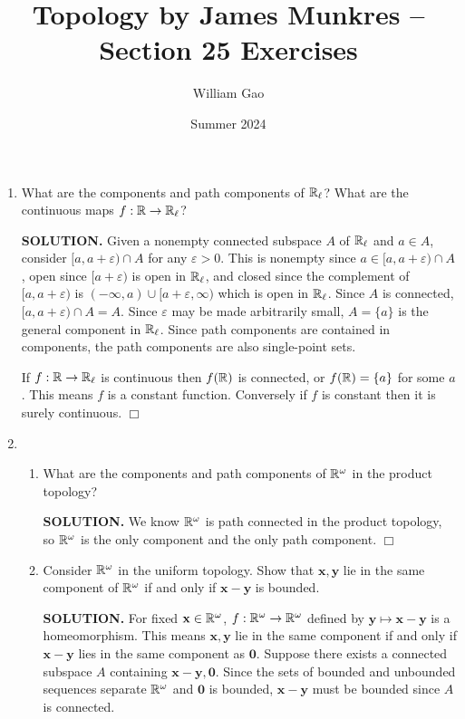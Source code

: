\documentclass{article}
\title{Topology by James Munkres -- Section 25 Exercises}
\author{William Gao}
\date{Summer 2024}
\begin{document}
\maketitle

\begin{enumerate}
    \item What are the components and path components of $\mathbb{R}_\ell$? What are the continuous maps $f: \mathbb{R} \rightarrow \mathbb{R}_\ell$?

    {\bf SOLUTION.} Given a nonempty connected subspace $A$ of $\mathbb{R}_\ell$ and $a \in A$, consider $[a, a + \varepsilon) \cap A$ for any $\varepsilon > 0$. This is nonempty since $a \in [a, a + \varepsilon) \cap A$, open since $[a + \varepsilon)$ is open in $\mathbb{R}_\ell$, and closed since the complement of $[a, a + \varepsilon)$ is $(-\infty, a) \cup [a + \varepsilon, \infty)$ which is open in $\mathbb{R}_\ell$. Since $A$ is connected, $[a, a + \varepsilon) \cap A = A$. Since $\varepsilon$ may be made arbitrarily small, $A = \{a\}$ is the general component in $\mathbb{R}_\ell$. Since path components are contained in components, the path components are also single-point sets.

    If $f: \mathbb{R} \rightarrow \mathbb{R}_\ell$ is continuous then $f(\mathbb{R})$ is connected, or $f(\mathbb{R}) = \{a\}$ for some $a$. This means $f$ is a constant function. Conversely if $f$ is constant then it is surely continuous. $\Box$

    \item \begin{enumerate}
        \item What are the components and path components of $\mathbb{R}^\omega$ in the product topology?

        {\bf SOLUTION.} We know $\mathbb{R}^\omega$ is path connected in the product topology, so $\mathbb{R}^\omega$ is the only component and the only path component. $\Box$
        
        \item Consider $\mathbb{R}^\omega$ in the uniform topology. Show that $\mathbf{x}, \mathbf{y}$ lie in the same component of $\mathbb{R}^\omega$ if and only if $\mathbf{x-y}$ is bounded.

        {\bf SOLUTION.} For fixed $\mathbf{x} \in \mathbb{R}^\omega$, $f: \mathbb{R}^\omega\rightarrow \mathbb{R}^\omega$ defined by $\mathbf{y}\mapsto \mathbf{x-y}$ is a homeomorphism. This means $\mathbf{x}, \mathbf{y}$ lie in the same component if and only if $\mathbf{x-y}$ lies in the same component as $\mathbf{0}$. Suppose there exists a connected subspace $A$ containing $\mathbf{x-y}, \mathbf{0}$. Since the sets of bounded and unbounded sequences separate $\mathbb{R}^\omega$ and $\mathbf{0}$ is bounded, $\mathbf{x-y}$ must be bounded since $A$ is connected.


\end{enumerate}
\end{enumerate}
\end{document}
